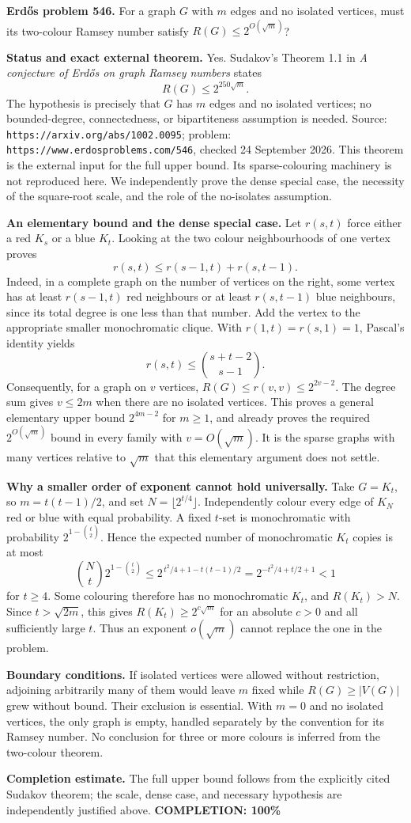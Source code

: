\textbf{Erd\H{o}s problem 546.}
For a graph $G$ with $m$ edges and no isolated vertices, must its two-colour Ramsey number satisfy $R(G)\leq2^{O(\sqrt m)}$?

\textbf{Status and exact external theorem.}
Yes. Sudakov's Theorem 1.1 in \emph{A conjecture of Erd\H{o}s on graph Ramsey numbers} states
\[
 R(G)\leq2^{250\sqrt m}.
\]
The hypothesis is precisely that $G$ has $m$ edges and no isolated vertices; no bounded-degree, connectedness, or bipartiteness assumption is needed. Source:
\texttt{https://arxiv.org/abs/1002.0095}; problem:
\texttt{https://www.erdosproblems.com/546}, checked 24 September 2026.
This theorem is the external input for the full upper bound. Its sparse-colouring machinery is not reproduced here. We independently prove the dense special case, the necessity of the square-root scale, and the role of the no-isolates assumption.

\textbf{An elementary bound and the dense special case.}
Let $r(s,t)$ force either a red $K_s$ or a blue $K_t$. Looking at the two colour neighbourhoods of one vertex proves
\[
 r(s,t)\leq r(s-1,t)+r(s,t-1).
\]
Indeed, in a complete graph on the number of vertices on the right, some vertex has at least $r(s-1,t)$ red neighbours or at least $r(s,t-1)$ blue neighbours, since its total degree is one less than that number. Add the vertex to the appropriate smaller monochromatic clique. With $r(1,t)=r(s,1)=1$, Pascal's identity yields
\[
 r(s,t)\leq\binom{s+t-2}{s-1}.
\]
Consequently, for a graph on $v$ vertices,
$R(G)\leq r(v,v)\leq 2^{2v-2}$.
The degree sum gives $v\leq2m$ when there are no isolated vertices. This proves a general elementary upper bound $2^{4m-2}$ for $m\geq1$, and already proves the required $2^{O(\sqrt m)}$ bound in every family with $v=O(\sqrt m)$. It is the sparse graphs with many vertices relative to $\sqrt m$ that this elementary argument does not settle.

\textbf{Why a smaller order of exponent cannot hold universally.}
Take $G=K_t$, so $m=t(t-1)/2$, and set $N=\lfloor2^{t/4}\rfloor$. Independently colour every edge of $K_N$ red or blue with equal probability. A fixed $t$-set is monochromatic with probability $2^{1-\binom t2}$. Hence the expected number of monochromatic $K_t$ copies is at most
\[
 \binom Nt2^{1-\binom t2}
 \leq2^{\,t^2/4+1-t(t-1)/2}
 =2^{-t^2/4+t/2+1}<1
\]
for $t\geq4$. Some colouring therefore has no monochromatic $K_t$, and $R(K_t)>N$. Since $t>\sqrt{2m}$, this gives $R(K_t)\geq2^{c\sqrt m}$ for an absolute $c>0$ and all sufficiently large $t$. Thus an exponent $o(\sqrt m)$ cannot replace the one in the problem.

\textbf{Boundary conditions.}
If isolated vertices were allowed without restriction, adjoining arbitrarily many of them would leave $m$ fixed while $R(G)\geq|V(G)|$ grew without bound. Their exclusion is essential. With $m=0$ and no isolated vertices, the only graph is empty, handled separately by the convention for its Ramsey number. No conclusion for three or more colours is inferred from the two-colour theorem.

\textbf{Completion estimate.}
The full upper bound follows from the explicitly cited Sudakov theorem; the scale, dense case, and necessary hypothesis are independently justified above.
\textbf{COMPLETION: 100\%}
